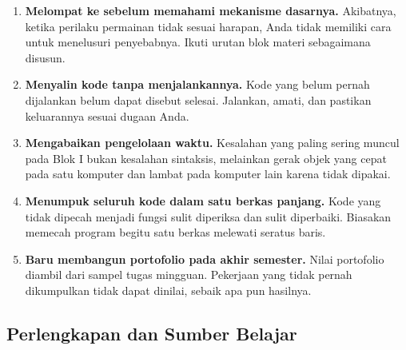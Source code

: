 \begin{peringatanbox}
\begin{enumerate}
  \item \textbf{Melompat ke  sebelum memahami mekanisme
        dasarnya.} Akibatnya, ketika perilaku permainan tidak sesuai harapan,
        Anda tidak memiliki cara untuk menelusuri penyebabnya. Ikuti urutan
        blok materi sebagaimana disusun.
  \item \textbf{Menyalin kode tanpa menjalankannya.} Kode yang belum pernah
        dijalankan belum dapat disebut selesai. Jalankan, amati, dan pastikan
        keluarannya sesuai dugaan Anda.
  \item \textbf{Mengabaikan pengelolaan waktu.} Kesalahan yang paling sering
        muncul pada Blok I bukan kesalahan sintaksis, melainkan gerak objek
        yang cepat pada satu komputer dan lambat pada komputer lain karena
         tidak dipakai.
  \item \textbf{Menumpuk seluruh kode dalam satu berkas panjang.} Kode yang
        tidak dipecah menjadi fungsi sulit diperiksa dan sulit diperbaiki.
        Biasakan memecah program begitu satu berkas melewati seratus baris.
  \item \textbf{Baru membangun portofolio pada akhir semester.} Nilai
        portofolio diambil dari sampel tugas mingguan. Pekerjaan yang tidak
        pernah dikumpulkan tidak dapat dinilai, sebaik apa pun hasilnya.
\end{enumerate}
\end{peringatanbox}

\subsection{Perlengkapan dan Sumber Belajar}

